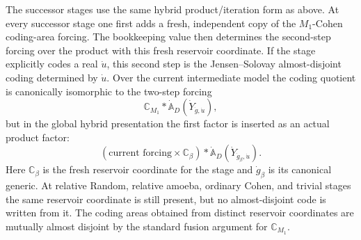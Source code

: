 \documentclass[a4paper,11pt]{article}
\begin{document}
The successor stages use the same hybrid product/iteration form as above.  At
every successor stage one first adds a fresh, independent copy of the
\(M_1\)-Cohen coding-area forcing.  The bookkeeping value then determines the
second-step forcing over the product with this fresh reservoir coordinate.  If
the stage explicitly codes a real \(\dot u\), this second step is the
Jensen--Solovay almost-disjoint coding determined by \(\dot u\).  Over the
current intermediate model the coding quotient is canonically isomorphic to the
two-step forcing
\[
   \mathbb C_{M_1}*\dot{\mathbb A}_D(\dot Y_{\dot g,\dot u}),
\]
but in the global hybrid presentation the first factor is inserted as an
actual product factor:
\[
   (\text{current forcing}\times \mathbb C_\beta)
   *\dot{\mathbb A}_D(\dot Y_{\dot g_\beta,\dot u}).
\]
Here \(\mathbb C_\beta\) is the fresh reservoir coordinate for the stage and
\(\dot g_\beta\) is its canonical generic.  At relative Random, relative amoeba,
ordinary Cohen, and trivial stages the same reservoir coordinate is still
present, but no almost-disjoint code is written from it.  The coding areas
obtained from distinct reservoir coordinates are mutually almost disjoint by
the standard fusion argument for \(\mathbb C_{M_1}\).
\end{document}
